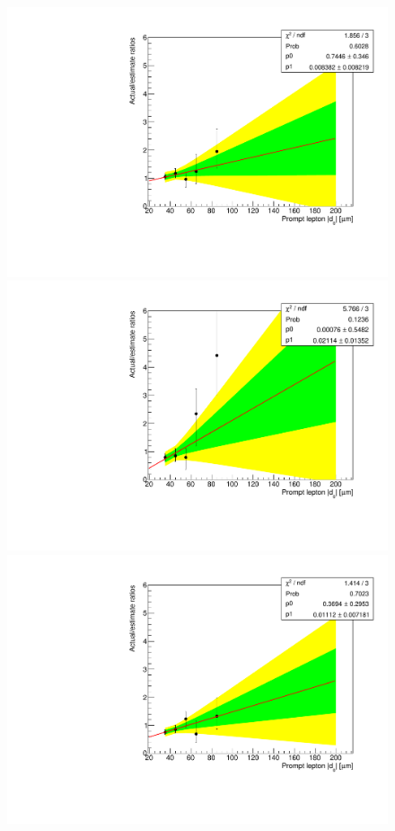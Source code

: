 \begin{figure}[hbtp]
\centering
\includegraphics[scale=0.35]{figures/bg/mumu_data_2016_displacedSubleading_ratiosVsPromptD0.pdf}
\includegraphics[scale=0.35]{figures/bg/mumu_data_2017_2018_displacedSubleading_ratiosVsPromptD0.pdf}
\includegraphics[scale=0.35]{figures/bg/mumu_data_2016_displacedLeading_ratiosVsPromptD0.pdf}

\end{figure}
